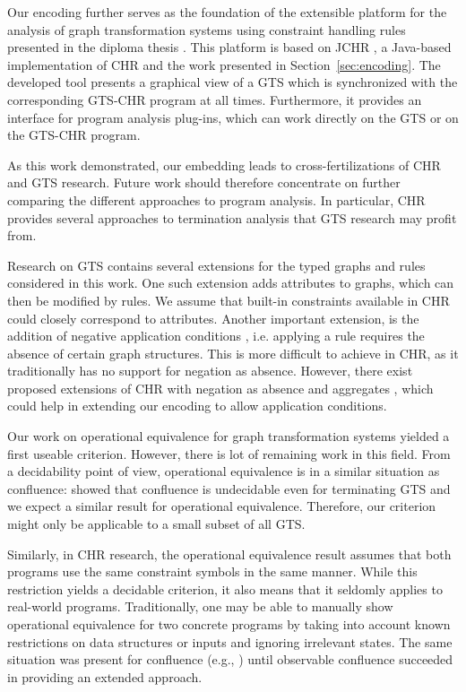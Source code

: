 \documentclass{tlp}
\begin{document}
Our encoding further serves as the foundation of the extensible platform for the
analysis of graph transformation systems using constraint handling rules
presented in the diploma thesis \cite{Wasserthal2009}. This platform is based on
JCHR \cite{jchr}, a Java-based implementation of CHR and the work presented in
Section~\ref{sec:encoding}. The developed tool presents a graphical view of a GTS
which is synchronized with the corresponding GTS-CHR program at all times.
Furthermore, it provides an interface for program analysis plug-ins, which can
work directly on the GTS or on the GTS-CHR program.

As this work demonstrated, our embedding leads to cross-fertilizations of CHR and
GTS research. Future work should therefore concentrate on further comparing the
different approaches to program analysis. In particular, CHR provides several
approaches to termination analysis
\cite{Fruhwirth2000,voets_pilozzi_deschreye_termination_techrep08,Pilozzi2008}
that GTS research may profit from.

Research on GTS contains several extensions for the typed graphs and rules
considered in this work. One such extension adds attributes
\cite{ehrigprangetaentzer06} to graphs, which can then be modified by rules. We
assume that built-in constraints available in CHR could closely correspond to
attributes. Another important extension, is the addition of negative application
conditions \cite{ehrigprangetaentzer06}, i.e. applying a rule requires the
absence of certain graph structures. This is more difficult to achieve in CHR, as
it traditionally has no support for negation as absence. However, there exist
proposed extensions of CHR with negation as absence
\cite{vanweert_sney_schr_demoen_negation_chr06} and aggregates
\cite{vanweert_sney_demoen_aggregates_lopstr07}, which could help in extending
our encoding to allow application conditions.

Our work on operational equivalence for graph transformation systems yielded a
first useable criterion. However, there is lot of remaining work in this field.
From a decidability point of view, operational equivalence is in a similar
situation as confluence: \cite{plump05} showed that confluence is undecidable
even for terminating GTS and we expect a similar result for operational
equivalence. Therefore, our criterion might only be applicable to a small subset
of all GTS.

Similarly, in CHR research, the operational equivalence result assumes that both
programs use the same constraint symbols in the same manner. While this
restriction yields a decidable criterion, it also means that it seldomly applies
to real-world programs. Traditionally, one may be able to manually show
operational equivalence for two concrete programs by taking into account known
restrictions on data structures or inputs and ignoring irrelevant states. The
same situation was present for confluence (e.g., \cite{fruehwirth05}) until
observable confluence \cite{duckstuckeysulzmann07} succeeded in providing an
extended approach.
\end{document}
